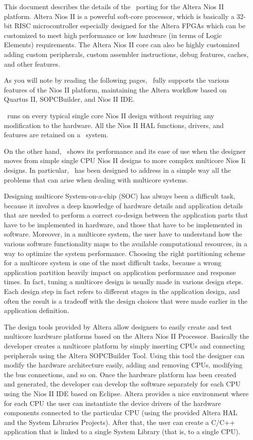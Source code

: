 This document describes the details of the \ee\ porting for the Altera
Nios II platform. Altera Nios II is a powerful soft-core processor,
which is basically a 32-bit RISC microcontroller especially designed
for the Altera FPGAs which can be customized to meet high performance
or low hardware (in terms of Logic Elements) requirements. The Altera
Nios II core can also be highly customized adding custom peripherals,
custom assembler instructions, debug features, caches, and other
features.

As you will note by reading the following pages, \ee\ fully supports
the various features of the Nios II platform, maintaining the Altera
workflow based on Quartus II, SOPCBuilder, and Nios II IDE.

\ee\ runs on every typical single core Nios II design without
requiring any modification to the hardware. All the Nios II HAL
functions, drivers, and features are retained on a \ee\ system.

On the other hand, \ee\ shows its performance and its ease of use when
the designer moves from simple single CPU Nios II designs to more
complex multicore Nios Ii designs. In particular, \ee\ has been
designed to address in a simple way all the problems that can arise
when dealing with multicore systems.

Designing multicore System-on-a-chip (SOC) has always been a difficult
task, because it involves a deep knowledge of hardware details and
application details that are needed to perform a correct co-design
between the application parts that have to be implemented in hardware,
and those that have to be implemented in software. Moreover, in a
multicore system, the user have to understand how the various software
functionality maps to the available computational resources, in a way
to optimize the system performance. Choosing the right partitioning
scheme for a multicore system is one of the most difficult tasks,
because a wrong application partition heavily impact on application
performance and response times. In fact, tuning a multicore design is
usually made in various design steps. Each design step in fact refers
to different stages in the application design, and often the result is
a tradeoff with the design choices that were made earlier in the
application definition.

The design tools provided by Altera allow designers to easily create
and test multicore hardware platforms based on the Altera Nios II
Processor. Basically the developer creates a multicore platform by
simply inserting CPUs and connecting peripherals using the Altera
SOPCBuilder Tool. Using this tool the designer can modify the hardware
architecture easily, adding and removing CPUs, modifying the bus
connections, and so on. Once the hardware platform has been created
and generated, the developer can develop the software separately for
each CPU using the Nios II IDE based on Eclipse. Altera provides a
nice environment where for each CPU the user can instantiate the
device drivers of the hardware components connected to the particular
CPU (using the provided Altera HAL and the System Libraries
Projects). After that, the user can create a C/C++ application that is
linked to a single System Library (that is, to a single CPU).

